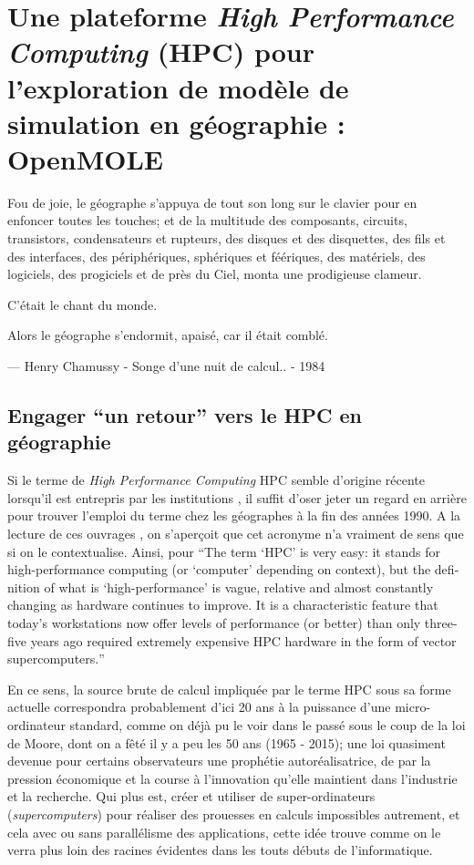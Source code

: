 
\newcommand\litem[1]{\item{\bfseries #1,\enspace}}

\section{Une plateforme \textit{High Performance Computing} (HPC) pour l'exploration de modèle de simulation en géographie : OpenMOLE}
\label{sec:retourgeoHPCopenmole}

\epigraph {Fou de joie, le géographe s'appuya de tout son long sur le clavier pour en enfoncer toutes les touches; et de la multitude des composants, circuits, transistors, condensateurs et rupteurs, des disques et des disquettes, des fils et des interfaces, des périphériques, sphériques et féériques, des matériels, des logiciels, des progiciels et de près du Ciel, monta une prodigieuse clameur.

C'était le chant du monde.

Alors le géographe s'endormit, apaisé, car il était comblé.}{ --- \textup{Henry Chamussy - Songe d'une nuit de calcul.. - 1984}}

\subsection{Engager \enquote{un retour} vers le HPC en géographie}
\label{ssec:retourHPC}

Si le terme de \textit{High Performance Computing} HPC semble d'origine récente lorsqu'il est entrepris par les institutions \autocite{HPCHorizon2020}, il suffit d'oser jeter un regard en arrière pour trouver l'emploi du terme chez les géographes à la fin des années 1990. A la lecture de ces ouvrages \autocites{Turton1998, Openshaw2000, Openshaw2000b}, on s'aperçoit que cet acronyme n'a vraiment de sens que si on le contextualise. Ainsi, pour \textcite{Openshaw2000} \foreignquote{english}{The term \enquote{HPC} is very easy: it stands for high-performance computing (or \enquote{computer} depending on context), but the definition of what is \enquote{high-performance} is vague, relative and almost constantly changing as hardware continues to improve. It is a characteristic feature that today's workstations now offer levels of performance (or better) than only three-five years ago required extremely expensive HPC hardware in the form of vector supercomputers.}

En ce sens, la source brute de calcul impliquée par le terme HPC sous sa forme actuelle correspondra probablement d'ici 20 ans à la puissance d'une micro-ordinateur standard, comme on déjà pu le voir dans le passé sous le coup de la loi de Moore, dont on a fêté il y a peu les 50 ans (1965 - 2015); une loi quasiment devenue pour certains observateurs une prophétie autoréalisatrice, de par la pression économique et la course à l'innovation qu'elle maintient dans l'industrie et la recherche. Qui plus est, créer et utiliser de super-ordinateurs (\textit{supercomputers}) pour réaliser des prouesses en calculs impossibles autrement, et cela avec ou sans parallélisme des applications, cette idée trouve comme on le verra plus loin des racines évidentes dans les touts débuts de l'informatique.

